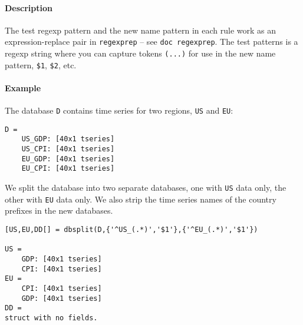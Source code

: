 \paragraph{Description}

The test regexp pattern and the new name pattern in each rule work as an
expression-replace pair in \texttt{regexprep} -- see
\texttt{doc regexprep}. The test patterns is a regexp string where you
can capture tokens \texttt{(...)} for use in the new name pattern,
\texttt{\$1}, \texttt{\$2}, etc.

\paragraph{Example}

The database \texttt{D} contains time series for two regions,
\texttt{US} and \texttt{EU}:

\begin{verbatim}
D = 
    US_GDP: [40x1 tseries]
    US_CPI: [40x1 tseries]
    EU_GDP: [40x1 tseries]
    EU_CPI: [40x1 tseries]
\end{verbatim}

We split the database into two separate databases, one with \texttt{US}
data only, the other with \texttt{EU} data only. We also strip the time
series names of the country prefixes in the new databases.

\begin{verbatim}
[US,EU,DD[] = dbsplit(D,{'^US_(.*)','$1'},{'^EU_(.*)','$1'})

US = 
    GDP: [40x1 tseries]
    CPI: [40x1 tseries]
EU = 
    CPI: [40x1 tseries]
    GDP: [40x1 tseries]
DD = 
struct with no fields.
\end{verbatim}


